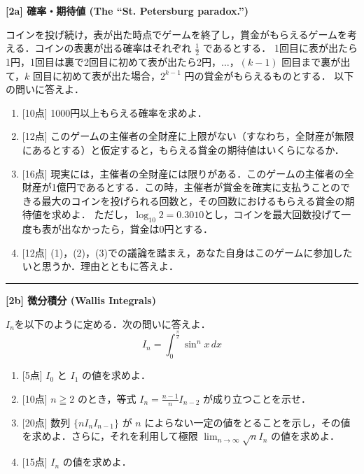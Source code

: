 \documentclass{jlreq}
\theoremstyle{definition}
\begin{document}
\newpage

\noindent\textbf{\large [2a] 確率・期待値 (The “St. Petersburg paradox.”)}

コインを投げ続け，表が出た時点でゲームを終了し，賞金がもらえるゲームを考える．コインの表裏が出る確率はそれぞれ $\displaystyle \frac{1}{2}$ であるとする．
1回目に表が出たら1円，1回目は裏で2回目に初めて表が出たら2円，$\dots$，$(k-1)$ 回目まで裏が出て，$k$ 回目に初めて表が出た場合，$2^{k-1}$ 円の賞金がもらえるものとする．
以下の問いに答えよ．

\begin{enumerate}[label=(\arabic*)]
    \item {[10点]} 1000円以上もらえる確率を求めよ．
    \item {[12点]} このゲームの主催者の全財産に上限がない（すなわち，全財産が無限にあるとする）と仮定すると，もらえる賞金の期待値はいくらになるか．
    \item {[16点]} 現実には，主催者の全財産には限りがある．このゲームの主催者の全財産が1億円であるとする．この時，主催者が賞金を確実に支払うことのできる最大のコインを投げられる回数と，その回数におけるもらえる賞金の期待値を求めよ．
                   ただし，$\log_{10}2=0.3010$とし，コインを最大回数投げて一度も表が出なかったら，賞金は0円とする．
    \item {[12点]} (1)，(2)，(3)での議論を踏まえ，あなた自身はこのゲームに参加したいと思うか．理由とともに答えよ．
\end{enumerate}

\vspace{10mm}
\hrule
\vspace{10mm}

\noindent\textbf{\large [2b] 微分積分 (Wallis Integrals)}

$I_n$を以下のように定める．次の問いに答えよ．
\[I_n = \int_0^{\frac{\pi}{2}} \sin^n x \, dx\]

\begin{enumerate}[label=(\arabic*)]
    \item {[5点]} $I_0$ と $I_1$ の値を求めよ．
    \item {[10点]} $n \geqq 2$ のとき，等式 $\displaystyle I_n = \frac{n-1}{n} I_{n-2}$ が成り立つことを示せ．
    \item {[20点]} 数列 $\{ n I_n I_{n-1} \}$ が $n$ によらない一定の値をとることを示し，その値を求めよ．さらに，それを利用して極限 $\displaystyle \lim_{n \to \infty} \sqrt{n} I_n$ の値を求めよ．
    \item {[15点]} $I_n$ の値を求めよ．
\end{enumerate}
\end{document}

